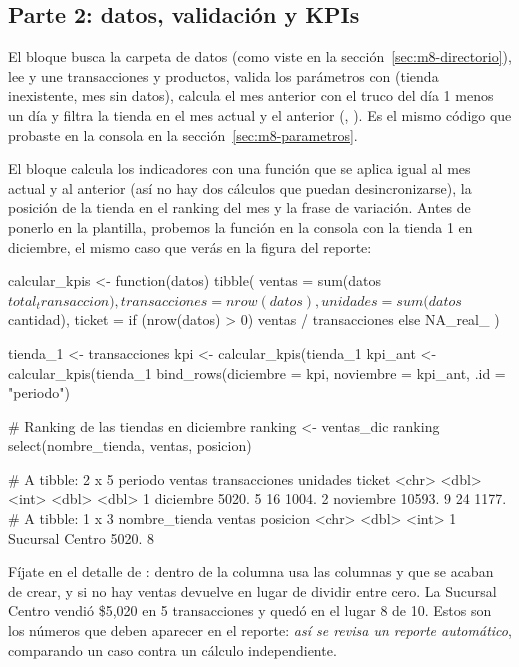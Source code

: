 \subsection{Parte 2: datos, validación y KPIs}

El bloque  busca la carpeta de datos (como viste en la
sección~\ref{sec:m8-directorio}), lee y une transacciones y productos, valida
los parámetros con  (tienda inexistente, mes sin datos),
calcula el mes anterior con el truco del día 1 menos un día y filtra la
tienda en el mes actual y el anterior (,
). Es el mismo código que probaste en la consola en
la sección~\ref{sec:m8-parametros}.

El bloque  calcula los indicadores con una función que se
aplica igual al mes actual y al anterior (así no hay dos cálculos que puedan
desincronizarse), la posición de la tienda en el ranking del mes y la frase
de variación. Antes de ponerlo en la plantilla, probemos la función en la
consola con la tienda 1 en diciembre, el mismo caso que verás en la figura
del reporte:

\begin{rcode}
calcular_kpis <- function(datos) {
  tibble(
    ventas        = sum(datos$total_transaccion),
    transacciones = nrow(datos),
    unidades      = sum(datos$cantidad),
    ticket        = if (nrow(datos) > 0) ventas / transacciones
                    else NA_real_
  )
}

tienda_1 <- transacciones %
kpi     <- calcular_kpis(tienda_1 %
kpi_ant <- calcular_kpis(tienda_1 %
bind_rows(diciembre = kpi, noviembre = kpi_ant, .id = "periodo")

# Ranking de las tiendas en diciembre
ranking <- ventas_dic %
ranking %
  select(nombre_tienda, ventas, posicion)
\end{rcode}
\begin{rsalida}
# A tibble: 2 x 5
  periodo   ventas transacciones unidades ticket
  <chr>      <dbl>         <int>    <dbl>  <dbl>
1 diciembre  5020.             5       16  1004.
2 noviembre 10593.             9       24  1177.
# A tibble: 1 x 3
  nombre_tienda   ventas posicion
  <chr>            <dbl>    <int>
1 Sucursal Centro  5020.        8
\end{rsalida}

Fíjate en el detalle de : dentro de
 la columna  usa las columnas
 y  que se acaban de crear, y si no hay
ventas devuelve  en lugar de dividir entre cero. La Sucursal
Centro vendió \$5,020 en 5 transacciones y quedó en el lugar 8 de 10. Estos
son los números que deben aparecer en el reporte: \emph{así se revisa un
reporte automático}, comparando un caso contra un cálculo independiente.

